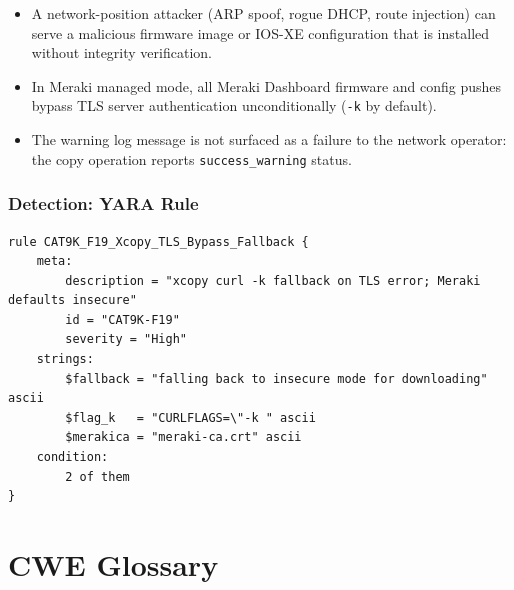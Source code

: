 \documentclass[11pt,a4paper]{article}
\begin{document}
\begin{itemize}[nosep]
  \item A network-position attacker (ARP spoof, rogue DHCP, route injection) can serve
    a malicious firmware image or IOS-XE configuration that is installed without
    integrity verification.
  \item In Meraki managed mode, all Meraki Dashboard firmware and config pushes bypass
    TLS server authentication unconditionally (\texttt{-k} by default).
  \item The warning log message is not surfaced as a failure to the network operator:
    the copy operation reports \texttt{success\_warning} status.
\end{itemize}

\subsubsection{Detection: YARA Rule}

\begin{lstlisting}[style=yara]
rule CAT9K_F19_Xcopy_TLS_Bypass_Fallback {
    meta:
        description = "xcopy curl -k fallback on TLS error; Meraki defaults insecure"
        id = "CAT9K-F19"
        severity = "High"
    strings:
        $fallback = "falling back to insecure mode for downloading" ascii
        $flag_k   = "CURLFLAGS=\"-k " ascii
        $merakica = "meraki-ca.crt" ascii
    condition:
        2 of them
}
\end{lstlisting}

\section{CWE Glossary}
\end{document}
